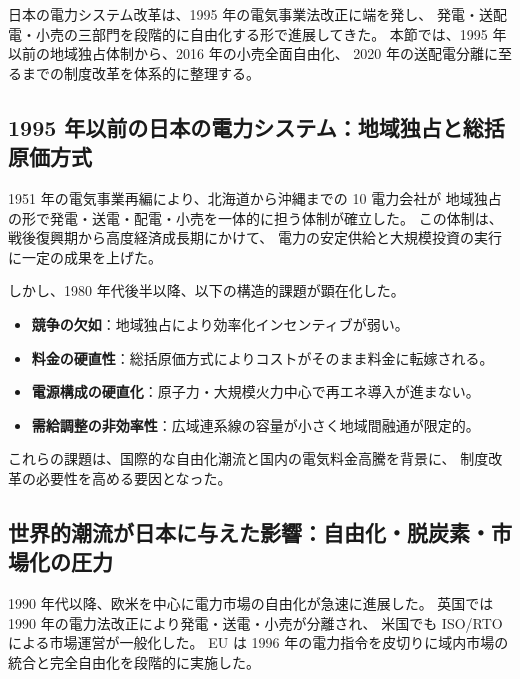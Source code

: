 日本の電力システム改革は、1995 年の電気事業法改正に端を発し、
発電・送配電・小売の三部門を段階的に自由化する形で進展してきた。
本節では、1995 年以前の地域独占体制から、2016 年の小売全面自由化、
2020 年の送配電分離に至るまでの制度改革を体系的に整理する。


\subsection{1995 年以前の日本の電力システム：地域独占と総括原価方式}

1951 年の電気事業再編により、北海道から沖縄までの 10 電力会社が
地域独占の形で発電・送電・配電・小売を一体的に担う体制が確立した。
この体制は、戦後復興期から高度経済成長期にかけて、
電力の安定供給と大規模投資の実行に一定の成果を上げた。

しかし、1980 年代後半以降、以下の構造的課題が顕在化した。

\begin{itemize}
  \item \textbf{競争の欠如}：地域独占により効率化インセンティブが弱い。
  \item \textbf{料金の硬直性}：総括原価方式によりコストがそのまま料金に転嫁される。
  \item \textbf{電源構成の硬直化}：原子力・大規模火力中心で再エネ導入が進まない。
  \item \textbf{需給調整の非効率性}：広域連系線の容量が小さく地域間融通が限定的。
\end{itemize}

これらの課題は、国際的な自由化潮流と国内の電気料金高騰を背景に、
制度改革の必要性を高める要因となった。


\subsection{世界的潮流が日本に与えた影響：自由化・脱炭素・市場化の圧力}

1990 年代以降、欧米を中心に電力市場の自由化が急速に進展した。
英国では 1990 年の電力法改正により発電・送電・小売が分離され、
米国でも ISO/RTO による市場運営が一般化した。
EU は 1996 年の電力指令を皮切りに域内市場の統合と完全自由化を段階的に実施した。


